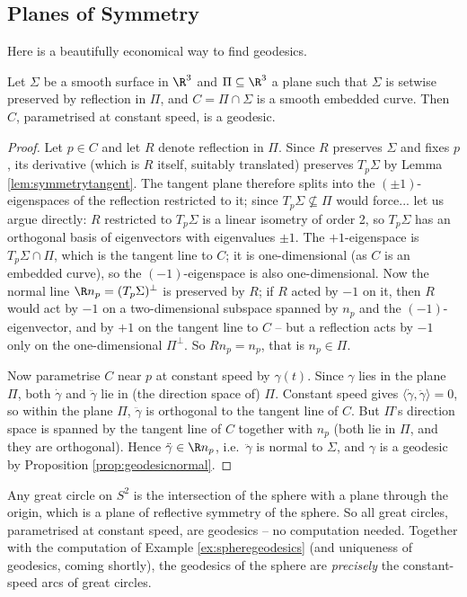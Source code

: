 \subsection{Planes of Symmetry}

Here is a beautifully economical way to find geodesics.

\begin{proposition}\label{prop:planesymmetry}
    Let $\Sigma$ be a smooth surface in $\R^3$ and $\Pi \subseteq \R^3$ a plane such that $\Sigma$ is setwise preserved by reflection in $\Pi$, and $C = \Pi \cap \Sigma$ is a smooth embedded curve. Then $C$, parametrised at constant speed, is a geodesic.
\end{proposition}
\begin{proof}
    Let $p \in C$ and let $R$ denote reflection in $\Pi$. Since $R$ preserves $\Sigma$ and fixes $p$, its derivative (which is $R$ itself, suitably translated) preserves $T_p\Sigma$ by Lemma \ref{lem:symmetrytangent}. The tangent plane therefore splits into the $(\pm 1)$-eigenspaces of the reflection restricted to it; since $T_p\Sigma \not\subseteq \Pi$ would force... let us argue directly: $R$ restricted to $T_p\Sigma$ is a linear isometry of order 2, so $T_p\Sigma$ has an orthogonal basis of eigenvectors with eigenvalues $\pm 1$. The $+1$-eigenspace is $T_p\Sigma \cap \Pi$, which is the tangent line to $C$; it is one-dimensional (as $C$ is an embedded curve), so the $(-1)$-eigenspace is also one-dimensional. Now the normal line $\R n_p = (T_p\Sigma)^\perp$ is preserved by $R$; if $R$ acted by $-1$ on it, then $R$ would act by $-1$ on a two-dimensional subspace spanned by $n_p$ and the $(-1)$-eigenvector, and by $+1$ on the tangent line to $C$ -- but a reflection acts by $-1$ only on the one-dimensional $\Pi^\perp$. So $R n_p = n_p$, that is $n_p \in \Pi$.

    Now parametrise $C$ near $p$ at constant speed by $\gamma(t)$. Since $\gamma$ lies in the plane $\Pi$, both $\dot\gamma$ and $\ddot\gamma$ lie in (the direction space of) $\Pi$. Constant speed gives $\langle \dot\gamma, \ddot\gamma\rangle = 0$, so within the plane $\Pi$, $\ddot\gamma$ is orthogonal to the tangent line of $C$. But $\Pi$'s direction space is spanned by the tangent line of $C$ together with $n_p$ (both lie in $\Pi$, and they are orthogonal). Hence $\ddot\gamma \in \R n_p$, i.e.\ $\ddot\gamma$ is normal to $\Sigma$, and $\gamma$ is a geodesic by Proposition \ref{prop:geodesicnormal}.
\end{proof}

\begin{example}
    Any great circle on $S^2$ is the intersection of the sphere with a plane through the origin, which is a plane of reflective symmetry of the sphere. So all great circles, parametrised at constant speed, are geodesics -- no computation needed. Together with the computation of Example \ref{ex:spheregeodesics} (and uniqueness of geodesics, coming shortly), the geodesics of the sphere are \emph{precisely} the constant-speed arcs of great circles.
\end{example}

